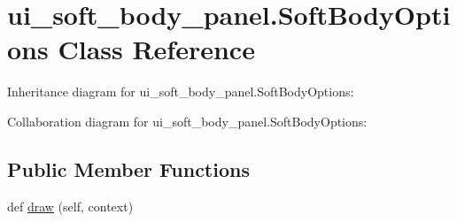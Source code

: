 \hypertarget{classui__soft__body__panel_1_1SoftBodyOptions}{}\section{ui\+\_\+soft\+\_\+body\+\_\+panel.\+Soft\+Body\+Options Class Reference}
\label{classui__soft__body__panel_1_1SoftBodyOptions}


 




Inheritance diagram for ui\+\_\+soft\+\_\+body\+\_\+panel.\+Soft\+Body\+Options\+:


Collaboration diagram for ui\+\_\+soft\+\_\+body\+\_\+panel.\+Soft\+Body\+Options\+:
\subsection*{Public Member Functions}
\begin{DoxyCompactItemize}
\item 
def \hyperlink{classui__soft__body__panel_1_1SoftBodyOptions_acad3357e123959ae38428fe82676db96}{draw} (self, context)
\end{DoxyCompactItemize}
